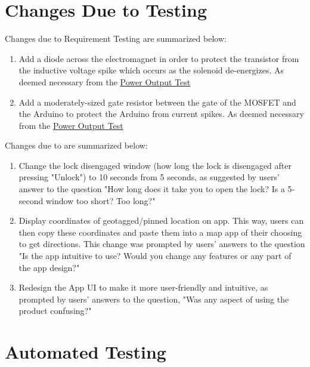 \documentclass[12pt, titlepage]{article}
\begin{document}
\section{Changes Due to Testing} \label{Changes Due to Testing}


Changes due to Requirement Testing are summarized below:
\begin{enumerate}
    \item Add a diode across the electromagnet in order to protect the transistor from the inductive voltage spike which occurs as the solenoid de-energizes. As deemed necessary from the \hyperref[PowerOutput]{Power Output Test}
    \item Add a moderately-sized gate resistor between the gate of the MOSFET and the Arduino to protect the Arduino from current spikes. As deemed necessary from the \hyperref[PowerOutput]{Power Output Test}
\end{enumerate}

Changes due to  are summarized below:

\begin{enumerate}
    \item Change the lock disengaged window (how long the lock is disengaged after pressing "Unlock") to 10 seconds from 5 seconds, as suggested by users' answer to the question "How long does it take you to open the lock? Is a 5-second window too short? Too long?"
    \item Display coordinates of geotagged/pinned location on app. This way, users can then copy these coordinates and paste them into a map app of their choosing to get directions. This change was prompted by users' answers to the question "Is the app intuitive to use? Would you change any features or any part of the app design?"
    \item Redesign the App UI to make it more user-friendly and intuitive, as prompted by users' answers to the question, "Was any aspect of using the product confusing?"
 
\end{enumerate}

\section{Automated Testing} \label{Automated Testing}
\end{document}
